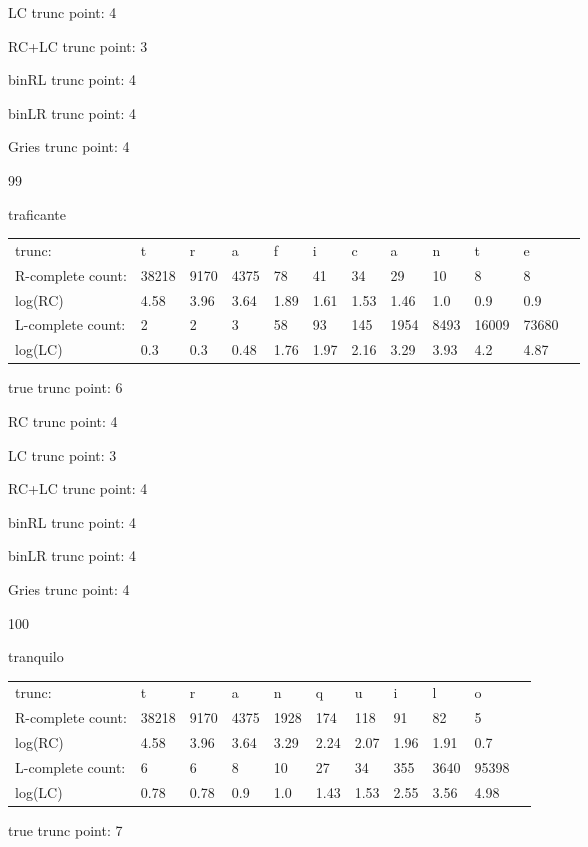 \documentclass[10pt]{article}
\begin{document}
LC trunc point: 4

RC+LC trunc point: 3

binRL trunc point: 4

binLR trunc point: 4

Gries trunc point: 4

\vspace{1em}

99

traficante

\begin{tabular}{l|lllllllllll}
trunc: & t & r & a & f & i & c & a & n & t & e & \\ 
R-complete count: & 38218 & 9170 & 4375 & 78 & 41 & 34 & 29 & 10 & 8 & 8 & \\ 
log(RC) & 4.58 & 3.96 & 3.64 & 1.89 & 1.61 & 1.53 & 1.46 & 1.0 & 0.9 & 0.9 & \\ 
L-complete count: & 2 & 2 & 3 & 58 & 93 & 145 & 1954 & 8493 & 16009 & 73680 & \\ 
log(LC) & 0.3 & 0.3 & 0.48 & 1.76 & 1.97 & 2.16 & 3.29 & 3.93 & 4.2 & 4.87 & \\ 
\end{tabular}

true trunc point: 6

RC trunc point: 4

LC trunc point: 3

RC+LC trunc point: 4

binRL trunc point: 4

binLR trunc point: 4

Gries trunc point: 4

\vspace{1em}

100

tranquilo

\begin{tabular}{l|llllllllll}
trunc: & t & r & a & n & q & u & i & l & o & \\ 
R-complete count: & 38218 & 9170 & 4375 & 1928 & 174 & 118 & 91 & 82 & 5 & \\ 
log(RC) & 4.58 & 3.96 & 3.64 & 3.29 & 2.24 & 2.07 & 1.96 & 1.91 & 0.7 & \\ 
L-complete count: & 6 & 6 & 8 & 10 & 27 & 34 & 355 & 3640 & 95398 & \\ 
log(LC) & 0.78 & 0.78 & 0.9 & 1.0 & 1.43 & 1.53 & 2.55 & 3.56 & 4.98 & \\ 
\end{tabular}

true trunc point: 7
\end{document}
